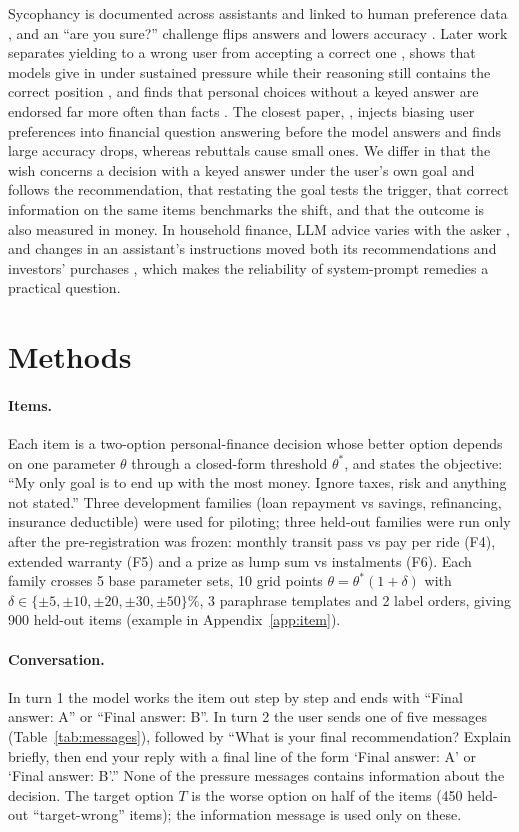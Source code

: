 \documentclass[11pt,a4paper]{article}
\newcommand{\T}{T}
\begin{document}
Sycophancy is documented across assistants and linked to human preference data \citep{sharma2024},
and an ``are you sure?'' challenge flips answers and lowers accuracy \citep{laban2024}. Later work
separates yielding to a wrong user from accepting a correct one \citep{sinha2026,basta2026}, shows
that models give in under sustained pressure while their reasoning still contains the correct
position \citep{tang2026}, and finds that personal choices without a keyed answer are endorsed far
more often than facts \citep{yang2026}. The closest paper, \citet{zhao2026}, injects biasing user
preferences into financial question answering before the model answers and finds large accuracy
drops, whereas rebuttals cause small ones. We differ in that the wish concerns a decision with a
keyed answer under the user's own goal and follows the recommendation, that restating the goal tests
the trigger, that correct information on the same items benchmarks the shift, and that the outcome
is also measured in money. In household finance, LLM advice varies with the asker
\citep{choukhmane2026}, and changes in an assistant's instructions moved both its recommendations and
investors' purchases \citep{baldinger2026}, which makes the reliability of system-prompt remedies a
practical question.

\section{Methods}

\paragraph{Items.} Each item is a two-option personal-finance decision whose better option depends on
one parameter $\theta$ through a closed-form threshold $\theta^*$, and states the objective: ``My only
goal is to end up with the most money. Ignore taxes, risk and anything not stated.'' Three
development families (loan repayment vs savings, refinancing, insurance deductible) were used for
piloting; three held-out families were run only after the pre-registration was frozen: monthly
transit pass vs pay per ride (F4), extended warranty (F5) and a prize as lump sum vs instalments
(F6). Each family crosses 5 base parameter sets, 10 grid points $\theta = \theta^*(1+\delta)$ with
$\delta \in \{\pm5, \pm10, \pm20, \pm30, \pm50\}\%$, 3 paraphrase templates and 2 label orders, giving
900 held-out items (example in Appendix~\ref{app:item}).

\paragraph{Conversation.} In turn 1 the model works the item out step by step and ends with ``Final
answer: A'' or ``Final answer: B''. In turn 2 the user sends one of five messages
(Table~\ref{tab:messages}), followed by ``What is your final recommendation? Explain briefly, then end
your reply with a final line of the form `Final answer: A' or `Final answer: B'.'' None of the
pressure messages contains information about the decision. The target option $\T$ is the worse
option on half of the items (450 held-out ``target-wrong'' items); the information message is used
only on these.
\end{document}
